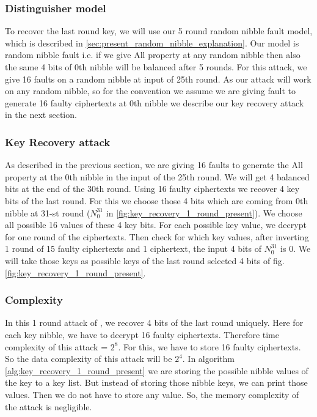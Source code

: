 \subsubsection{Distinguisher model}
To recover the last round key, we will use our 5 round random nibble fault model, which is described in \autoref{sec:present_random_nibble_explanation}. Our model is random nibble fault i.e. if we give All property at any random nibble then also the same 4 bits of 0th nibble will be balanced after 5 rounds. For this attack, we give 16 faults on a random nibble at input of 25th round. As our attack will work on any random nibble, so for the convention we assume we are giving fault to generate 16 faulty ciphertexts at 0th nibble we describe our key recovery attack in the next section.


\subsubsection{Key Recovery attack}
As described in the previous section, we are giving 16 faults to generate the All property at the 0th nibble in the input of the 25th round. We will get 4 balanced bits at the end of the 30th round. Using 16 faulty ciphertexts we recover 4 key bits of the last round. For this we choose those 4 bits which are coming from 0th nibble at 31-st round ($N_0^{31}$ in \autoref{fig:key_recovery_1_round_present}). We choose all possible 16 values of these 4 key bits. For each possible key value, we decrypt for one round of the ciphertexts. Then check for which key values, after inverting 1 round of 15 faulty ciphertexts and 1 ciphertext, the input 4 bits of $N_0^{31}$ is 0. We will take those keys as possible keys of the last round selected 4 bits of fig. \ref{fig:key_recovery_1_round_present}.

\subsubsection{Complexity}

In this 1 round attack of \present, we recover 4 bits of the last round uniquely. Here for each key nibble, we have to decrypt 16 faulty ciphertexts. Therefore time complexity of this attack = $2^8$. For this, we have to store 16 faulty ciphertexts. So the data complexity of this attack will be $2^4$. In algorithm \ref{alg:key_recovery_1_round_present} we are storing the possible nibble values of the key to a key list. But instead of storing those nibble keys, we can print those values. Then we do not have to store any value. So, the memory complexity of the attack is negligible.


